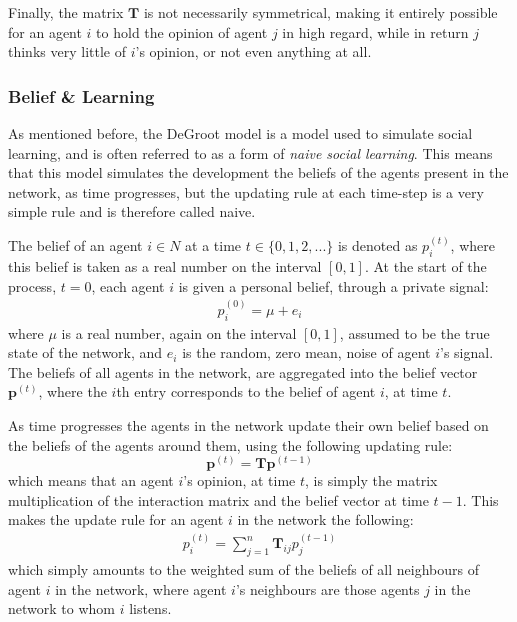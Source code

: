 \documentclass{article}
\newcommand{\T}{\textbf{T}}
\newcommand{\Tij}{\textbf{T}_{ij}}
\newcommand{\beli}[3][2]{p_{#2}^{(#3)}}
\begin{document}
Finally, the matrix $\T$ is not necessarily symmetrical, making it entirely possible for an agent $i$ to hold the opinion of agent $j$ in high regard, while in return $j$ thinks very little of $i$'s opinion, or not even anything  at all.

\newpage

\subsubsection{Belief \& Learning}
\label{beliefs}
As mentioned before, the DeGroot model is a model used to simulate social learning, and is often referred to as a form of \textit{naive social learning}. This means that this model simulates the development the beliefs of the agents present in the network, as time progresses, but the updating rule at each time-step is a very simple rule and is therefore called naive.

The belief of an agent $i \in N$ at a time $t \in \{0, 1, 2, ...\}$ is denoted as $p_{i}^{(t)}$, where this belief is taken as a real number on the interval $[0, 1]$. At the start of the process, $t=0$, each agent $i$ is given a personal belief, through a private signal:
\begin{align*}
    \beli{i}{0} = \mu + e_i
\end{align*}
where $\mu$ is a real number, again on the interval $[0, 1]$, assumed to be the true state of the network, and $e_i$ is the random, zero mean, noise of agent $i$'s signal. \newline
The beliefs of all agents in the network, are aggregated into the belief vector $\textbf{p}^{(t)}$, where the $i$th entry corresponds to the belief of agent $i$, at time $t$.

As time progresses the agents in the network update their own belief based on the beliefs of the agents around them, using the following updating rule:
\begin{equation}
    \label{updating:standard}
    \textbf{p}^{(t)} = \T\textbf{p}^{(t-1)}
\end{equation}
which means that an agent $i$'s opinion, at time $t$, is simply the matrix multiplication of the interaction matrix and the belief vector at time $t-1$. This makes the update rule for an agent $i$ in the network the following:
\begin{align*}
    \beli{i}{t} = \sum_{j=1}^{n}\Tij\beli{j}{t-1}
\end{align*}
which simply amounts to the weighted sum of the beliefs of all neighbours of agent $i$ in the network, where agent $i$'s neighbours are those agents $j$ in the network to whom $i$ listens.
\end{document}
